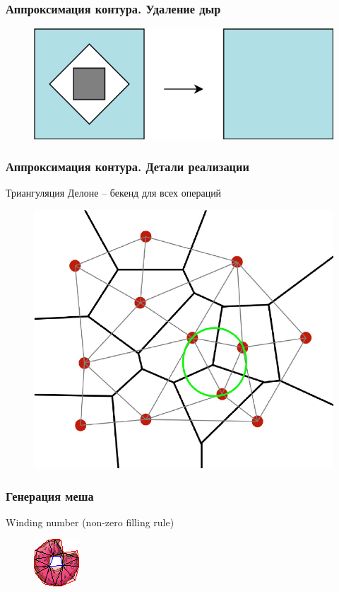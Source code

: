 \documentclass[10pt, unicode]{beamer}
\begin{document}
    \begin{frame}
        \frametitle{Аппроксимация контура. Удаление дыр}
        \begin{figure}[H]
            \centering
            \includegraphics[width=0.8\linewidth, keepaspectratio]{remove_hole.png}
        \end{figure}
    \end{frame}
    \begin{frame}
        \frametitle{Аппроксимация контура. Детали реализации}
        Триангуляция Делоне\cite{Delaunay} -- бекенд для всех операций
        \begin{figure}[H]
            \centering
            \includegraphics[width=0.7\linewidth, keepaspectratio]{DelaunayAndVoronoi.png}
        \end{figure}
    \end{frame}
    \begin{frame}
        \frametitle{Генерация меша}
        Winding number (non-zero filling rule)
        \begin{figure}[H]
            \centering
            \includegraphics[scale=1.5]{donutpixel_mesh.png}
        \end{figure}
    \end{frame}
\end{document}

